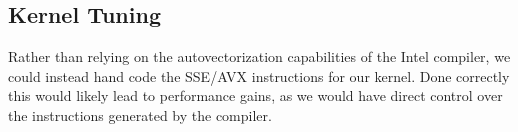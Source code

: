 \documentclass[fontsize=11pt]{scrartcl}
\numberwithin{equation}{section}        %
\numberwithin{figure}{section}          %
\numberwithin{table}{section}               %
\begin{document}
\subsection{Kernel Tuning}
Rather than relying on the autovectorization capabilities of the Intel compiler,
we could instead hand code the SSE/AVX instructions for our kernel.  Done 
correctly this would likely lead to performance gains, as we would have direct
control over the instructions generated by the compiler.
\end{document}
